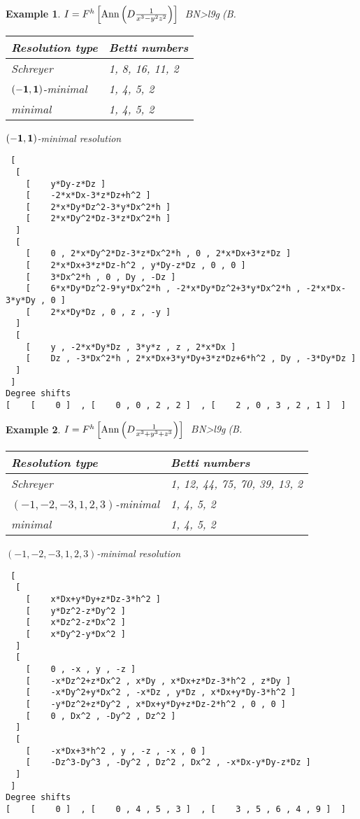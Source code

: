 \documentclass[12pt]{jarticle}
\newtheorem{example}{Example}
\begin{document}
\begin{example} \rm
$I = F^h\left[{\rm Ann}\left( D \frac{1}{x^3-y^2z^2} \right) \right]$
$B$N>l9g(B.

\begin{tabular}{|l|l|}
\hline
Resolution type &  Betti numbers          \\ \hline
Schreyer &                        1, 8, 16, 11, 2    \\ \hline
$(-{\bf 1},{\bf 1})$-minimal &    1, 4, 5, 2 \\ \hline
minimal &                         1, 4, 5, 2    \\
\hline
\end{tabular}

\noindent
$(-{\bf 1},{\bf 1})$-minimal resolution
{\footnotesize \begin{verbatim}
 [ 
  [ 
    [    y*Dy-z*Dz ] 
    [    -2*x*Dx-3*z*Dz+h^2 ] 
    [    2*x*Dy*Dz^2-3*y*Dx^2*h ] 
    [    2*x*Dy^2*Dz-3*z*Dx^2*h ] 
  ]
  [ 
    [    0 , 2*x*Dy^2*Dz-3*z*Dx^2*h , 0 , 2*x*Dx+3*z*Dz ] 
    [    2*x*Dx+3*z*Dz-h^2 , y*Dy-z*Dz , 0 , 0 ] 
    [    3*Dx^2*h , 0 , Dy , -Dz ] 
    [    6*x*Dy*Dz^2-9*y*Dx^2*h , -2*x*Dy*Dz^2+3*y*Dx^2*h , -2*x*Dx-3*y*Dy , 0 ] 
    [    2*x*Dy*Dz , 0 , z , -y ] 
  ]
  [ 
    [    y , -2*x*Dy*Dz , 3*y*z , z , 2*x*Dx ] 
    [    Dz , -3*Dx^2*h , 2*x*Dx+3*y*Dy+3*z*Dz+6*h^2 , Dy , -3*Dy*Dz ] 
  ]
 ]
Degree shifts 
[    [    0 ]  , [    0 , 0 , 2 , 2 ]  , [    2 , 0 , 3 , 2 , 1 ]  ] 
\end{verbatim}}
\end{example}

\begin{example} \rm
$I = F^h\left[{\rm Ann}\left( D \frac{1}{x^3+y^3+z^3} \right) \right]$
$B$N>l9g(B.

\begin{tabular}{|l|l|}
\hline
Resolution type &  Betti numbers          \\ \hline
Schreyer &    1, 12, 44, 75, 70, 39, 13, 2     \\ \hline
$(-1,-2,-3,1,2,3)$-minimal & 1, 4, 5, 2  \\ \hline
minimal & 1, 4, 5, 2                      \\
\hline
\end{tabular}

\noindent
$(-1,-2,-3,1,2,3)$-minimal resolution
{\footnotesize \begin{verbatim}
 [
  [
    [    x*Dx+y*Dy+z*Dz-3*h^2 ]
    [    y*Dz^2-z*Dy^2 ]
    [    x*Dz^2-z*Dx^2 ]
    [    x*Dy^2-y*Dx^2 ]
  ]
  [
    [    0 , -x , y , -z ]
    [    -x*Dz^2+z*Dx^2 , x*Dy , x*Dx+z*Dz-3*h^2 , z*Dy ]
    [    -x*Dy^2+y*Dx^2 , -x*Dz , y*Dz , x*Dx+y*Dy-3*h^2 ]
    [    -y*Dz^2+z*Dy^2 , x*Dx+y*Dy+z*Dz-2*h^2 , 0 , 0 ]
    [    0 , Dx^2 , -Dy^2 , Dz^2 ]
  ]
  [
    [    -x*Dx+3*h^2 , y , -z , -x , 0 ]
    [    -Dz^3-Dy^3 , -Dy^2 , Dz^2 , Dx^2 , -x*Dx-y*Dy-z*Dz ]
  ]
 ]
Degree shifts
[    [    0 ]  , [    0 , 4 , 5 , 3 ]  , [    3 , 5 , 6 , 4 , 9 ]  ]
\end{verbatim}}
\end{example}
\end{document}
